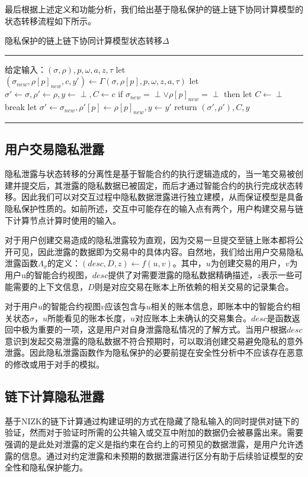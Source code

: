 最后根据上述定义和功能分析，我们给出基于隐私保护的链上链下协同计算模型的状态转移流程如下所示。
\begin{center}
    隐私保护的链上链下协同计算模型状态转移$\Delta$
\end{center}
\noindent\hrule
\begin{description}
    \item 给定输入：$(\sigma, \rho), p, \omega, a, z, \tau$
    \subitem let $(\sigma_{new}, \rho[p]_{new}, c, y') \leftarrow \Gamma(\sigma, \rho[p], p, \omega, z, a, \tau)$
    \subitem let $\sigma' \leftarrow \sigma, \rho' \leftarrow \rho, y \leftarrow \perp, C \leftarrow c$
    \subitem if $\sigma_{new} = \perp \vee \rho[p]_{new} = \perp$ then
        \subsubitem let $C \leftarrow \perp$
        \subsubitem break
    \subitem let $\sigma' \leftarrow \sigma_{new}, \rho'[p] \leftarrow \rho[p]_{new}, y \leftarrow y'$
    \subitem return $(\sigma', \rho'), C, y$
\end{description}
\noindent\hrule
\subsection{用户交易隐私泄露}
隐私泄露与状态转移的分离性是基于智能合约的执行逻辑造成的，当一笔交易被创建并提交后，其泄露的隐私数据已被固定，而后才通过智能合约的执行完成状态转移。因此我们可以对交互过程中隐私数据泄露进行独立建模，从而保证模型是具备隐私保护性质的。如前所述，交互中可能存在的输入点有两个，用户构建交易与链下计算节点计算时使用的输入。

对于用户创建交易造成的隐私泄露较为直观，因为交易一旦提交至链上账本都将公开可见，因此泄露的数据即为交易中的具体内容。自然地，我们给出用户交易隐私泄露函数$\Lambda_\sigma$的定义：$(desc, D, z) \leftarrow f(u, v)$。其中，$u$为创建交易的用户，$v$为用户u的智能合约视图，$desc$提供了对需要泄露的隐私数据精确描述，$z$表示一些可能需要的上下文信息，$D$则是对应交易在账本上所依赖的相关交易的记录集合。

对于用户$u$的智能合约视图$v$应该包含与$u$相关的账本信息，即账本中的智能合约相关状态$\sigma$，$u$所能看见的账本长度，$u$对应账本上未确认的交易集合。$desc$是函数返回中极为重要的一项，这是用户对自身泄露隐私情况的了解方式。当用户根据$desc$意识到发起交易泄露的隐私数据不符合预期时，可以取消创建交易避免隐私的意外泄露。因此隐私泄露函数作为隐私保护的必要前提在安全性分析中不应该存在恶意的修改或用于对手的模拟。
\subsection{链下计算隐私泄露}
基于NIZK的链下计算通过构建证明的方式在隐藏了隐私输入的同时提供对链下的验证，然而对于验证时所需的公共输入或交互中附加的数据仍会被暴露出来。需要强调的是此处对泄露的定义是指约束在合约上的可预见的数据泄露，是用户允许透露的信息。通过对约定泄露和未预期的数据泄露进行区分有助于后续验证模型的安全性和隐私保护能力。


